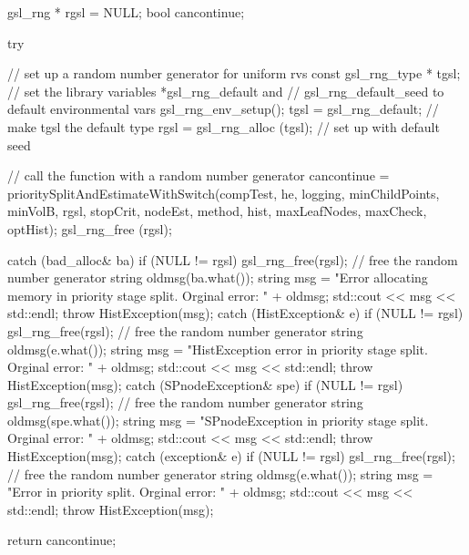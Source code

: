 \begin{DoxyCode}
{
    gsl_rng * rgsl = NULL;
    bool cancontinue;

    try {
        // set up a random number generator for uniform rvs
        const gsl_rng_type * tgsl;
        // set the library variables *gsl_rng_default and
        // gsl_rng_default_seed to default environmental vars
        gsl_rng_env_setup();
        tgsl = gsl_rng_default; // make tgsl the default type
        rgsl = gsl_rng_alloc (tgsl); // set up with default seed

        // call the function with a random number generator
        cancontinue = prioritySplitAndEstimateWithSwitch(compTest, he, logging,
       minChildPoints, 
                        minVolB, rgsl, stopCrit, nodeEst, method, hist,
                        maxLeafNodes, maxCheck, optHist);
        gsl_rng_free (rgsl);
    }

    catch (bad_alloc& ba) {
        if (NULL != rgsl) gsl_rng_free(rgsl); // free the random number
       generator
        string oldmsg(ba.what());
        string msg = "Error allocating memory in priority stage split.  Orginal
       error: "
                                     + oldmsg;
        std::cout << msg << std::endl;
        throw HistException(msg);
    }
    catch (HistException& e) {
        if (NULL != rgsl) gsl_rng_free(rgsl); // free the random number
       generator
        string oldmsg(e.what());
        string msg = "HistException error in priority stage split.  Orginal
       error: "
                                    + oldmsg;
        std::cout << msg << std::endl;
        throw HistException(msg);
    }
    catch (SPnodeException& spe) {
        if (NULL != rgsl) gsl_rng_free(rgsl); // free the random number
       generator
        string oldmsg(spe.what());
        string msg = "SPnodeException in priority stage split.  Orginal error: 
      "
                                    + oldmsg;
        std::cout << msg << std::endl;
        throw HistException(msg);
    }
    catch (exception& e) {
        if (NULL != rgsl) gsl_rng_free(rgsl); // free the random number
       generator
        string oldmsg(e.what());
        string msg = "Error in priority split.  Orginal error: " + oldmsg;
        std::cout << msg << std::endl;
        throw HistException(msg);
    }
   
   return cancontinue;
}
\end{DoxyCode}

